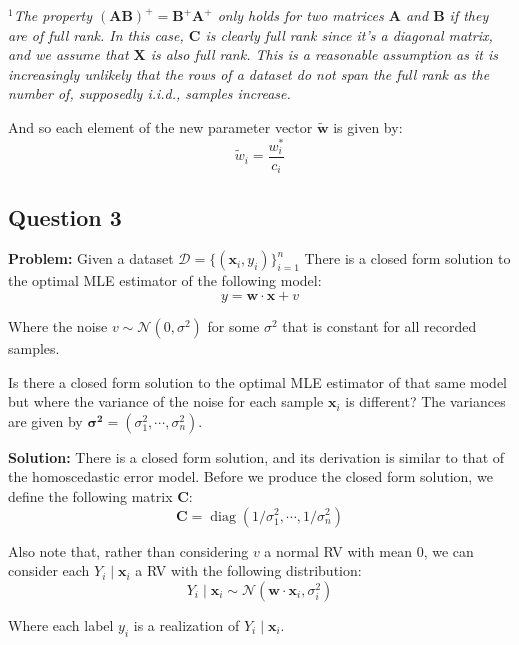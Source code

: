 \documentclass{article}
\renewcommand{\vec}[1]{\mathbf{#1}}
\newcommand{\mat}[1]{\mathbf{#1}}
\begin{document}
\textit{$^1$The property $(\mat A\mat B)^+=\mat B^+\mat A^+$ only holds for two matrices $\mat A$ and $\mat B$ if they are of full rank. In this case, $\mat C$ is clearly full rank since it's a diagonal matrix, and we assume that $\mat X$ is also full rank. This is a reasonable assumption as it is increasingly unlikely that the rows of a dataset do not span the full rank as the number of, supposedly i.i.d., samples increase.}
\bigskip

And so each element of the new parameter vector $\tilde{\vec w}$ is given by:
$$\tilde{w}_i=\frac{w^*_i}{c_i}$$

\subsection*{Question 3}
\noindent\textbf{Problem:} Given a dataset $\mathcal D=\{(\vec x_i,y_i)\}^n_{i=1}$ There is a closed form solution to the optimal MLE estimator of the following model:
$$y=\vec w\cdot\vec x+v$$

Where the noise $v\sim\mathcal N(0,\sigma^2)$ for some $\sigma^2$ that is constant for all recorded samples.
\bigskip

Is there a closed form solution to the optimal MLE estimator of that same model but where the variance of the noise for each sample $\vec x_i$ is different? The variances are given by $\boldsymbol{\sigma^2}=(\sigma_1^2,\cdots,\sigma^2_n)$.
\bigskip

\noindent\textbf{Solution:} There is a closed form solution, and its derivation is similar to that of the homoscedastic error model. Before we produce the closed form solution, we define the following matrix $\mat C$:
$$\mat C=\operatorname{diag}(1/\sigma^2_1,\cdots,1/\sigma^2_n)$$

Also note that, rather than considering $v$ a normal RV with mean 0, we can consider each $Y_i\mid\vec x_i$ a RV with the following distribution:
$$Y_i\mid\vec x_i\sim\mathcal N(\vec w\cdot\vec x_i,\sigma^2_i)$$

Where each label $y_i$ is a realization of $Y_i\mid\vec x_i$.
\newpage
\end{document}
